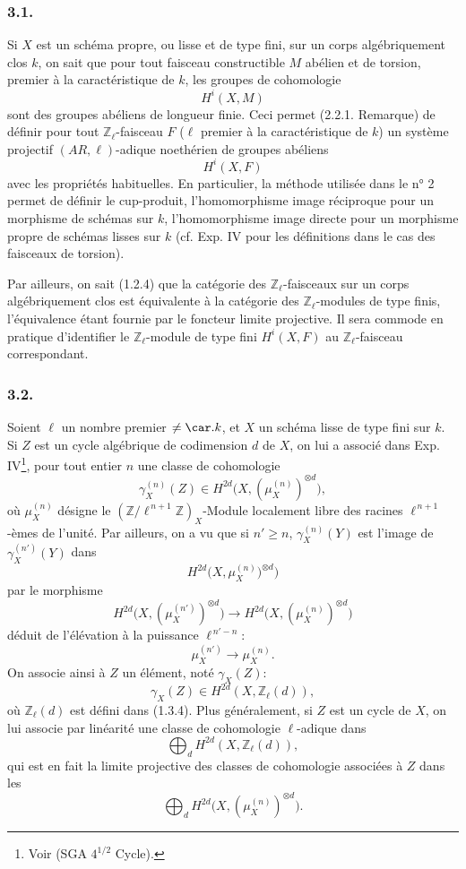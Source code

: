 \subsubsection*{3.1.}
Si \(X\) est un schéma propre, ou lisse et de type fini, sur un corps algébriquement clos \(k\), on sait que pour tout faisceau constructible \(M\) abélien et de torsion, premier à la caractéristique de \(k\), les groupes de cohomologie
\[
H^i(X,M)
\]
sont des groupes abéliens de longueur finie. Ceci permet (2.2.1. Remarque) de définir pour tout \(\mathbb{Z}_\ell\)-faisceau \(F\) (\(\ell\) premier à la caractéristique de \(k\)) un système projectif \((AR,\ell)\)-adique noethérien de groupes abéliens
\[
H^i(X,F)
\]
avec les propriétés habituelles. En particulier, la méthode utilisée dans le n° 2 permet de définir le cup-produit, l'homomorphisme image réciproque pour un morphisme de schémas sur \(k\), l'homomorphisme image directe pour un morphisme propre de schémas lisses sur \(k\) (cf. Exp. IV pour les définitions dans le cas des faisceaux de torsion).

Par ailleurs, on sait (1.2.4) que la catégorie des \(\mathbb{Z}_\ell\)-faisceaux sur un corps algébriquement clos est équivalente à la catégorie des \(\mathbb{Z}_\ell\)-modules de type finis, l'équivalence étant fournie par le foncteur limite projective. Il sera commode en pratique d'identifier le \(\mathbb{Z}_\ell\)-module de type fini \(H^i(X,F)\) au \(\mathbb{Z}_\ell\)-faisceau correspondant.

\subsubsection*{3.2.}
Soient \(\ell\) un nombre premier \(\ne\car.k\), et \(X\) un schéma lisse de type fini sur \(k\). Si \(Z\) est un cycle algébrique de codimension \(d\) de \(X\), on lui a associé dans Exp. IV\footnote{Voir (SGA \(4^{1/2}\) Cycle).}, pour tout entier \(n\) une classe de cohomologie
\[
\gamma_X^{(n)}(Z)\in H^{2d}\bigl(X,(\mu_X^{(n)})^{\otimes d}\bigr),
\]
où \(\mu_X^{(n)}\) désigne le \((\mathbb{Z}/\ell^{\,n+1}\mathbb{Z})_X\)-Module localement libre des racines \(\ell^{\,n+1}\)-èmes de l'unité. Par ailleurs, on a vu que si \(n'\ge n\), \(\gamma_X^{(n)}(Y)\) est l'image de \(\gamma_X^{(n')}(Y)\) dans
\[
H^{2d}\bigl(X,\mu_X^{(n)})^{\otimes d}\bigr)
\]
par le morphisme
\[
H^{2d}\bigl(X,(\mu_X^{(n')})^{\otimes d}\bigr)
\longrightarrow
H^{2d}\bigl(X,(\mu_X^{(n)})^{\otimes d}\bigr)
\]
déduit de l'élévation à la puissance \(\ell^{\,n'-n}\):
\[
\mu_X^{(n')}\longrightarrow \mu_X^{(n)}.
\]
On associe ainsi à \(Z\) un élément, noté \(\gamma_X(Z)\):
\[
\gamma_X(Z)\in H^{2d}(X,\mathbb{Z}_\ell(d)),
\]
où \(\mathbb{Z}_\ell(d)\) est défini dans (1.3.4). Plus généralement, si \(Z\) est un cycle de \(X\), on lui associe par linéarité une classe de cohomologie \(\ell\)-adique dans
\[
\bigoplus_d H^{2d}(X,\mathbb{Z}_\ell(d)),
\]
qui est en fait la limite projective des classes de cohomologie associées à \(Z\) dans les
\[
\bigoplus_d H^{2d}\bigl(X,(\mu_X^{(n)})^{\otimes d}\bigr).
\]

